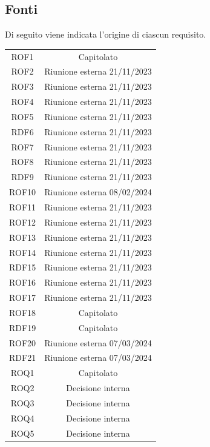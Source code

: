 \documentclass{article}
\newcommand{\custombold}{\contour{black}}
\begin{document}
\subsection{Fonti}
Di seguito viene indicata l'origine di ciascun requisito.\\
\begin{center}
\begin{tabular}{|c|c|}
\hline
\rowcolor{Blue}
\custombold{ID}&\custombold{Fonte}\\
\hline
\rowcolor{LighterBlue}
ROF1 & Capitolato\\
\hline
\rowcolor{LightBlue}
ROF2 & Riunione esterna 21/11/2023\\
\hline
\rowcolor{LighterBlue}
ROF3 & Riunione esterna 21/11/2023\\
\hline
\rowcolor{LightBlue}
ROF4 & Riunione esterna 21/11/2023\\
\hline
\rowcolor{LighterBlue}
ROF5 & Riunione esterna 21/11/2023\\
\hline
\rowcolor{LightBlue}
RDF6 & Riunione esterna 21/11/2023\\
\hline
\rowcolor{LighterBlue}
ROF7 & Riunione esterna 21/11/2023\\
\hline
\rowcolor{LightBlue}
ROF8 & Riunione esterna 21/11/2023\\
\hline
\rowcolor{LighterBlue}
RDF9 & Riunione esterna 21/11/2023\\
\hline
\rowcolor{LightBlue}
ROF10 & Riunione esterna 08/02/2024\\
\hline
\rowcolor{LighterBlue}
ROF11 & Riunione esterna 21/11/2023\\
\hline
\rowcolor{LightBlue}
ROF12 & Riunione esterna 21/11/2023\\
\hline
\rowcolor{LighterBlue}
ROF13 & Riunione esterna 21/11/2023\\
\hline
\rowcolor{LightBlue}
ROF14 & Riunione esterna 21/11/2023\\
\hline
\rowcolor{LighterBlue}
RDF15 & Riunione esterna 21/11/2023\\
\hline
\rowcolor{LightBlue}
ROF16 & Riunione esterna 21/11/2023\\
\hline
\rowcolor{LighterBlue}
ROF17 & Riunione esterna 21/11/2023\\
\hline
\rowcolor{LightBlue}
ROF18 & Capitolato\\
\hline
\rowcolor{LighterBlue}
RDF19 & Capitolato\\
\hline
\rowcolor{LightBlue}
ROF20 & Riunione esterna 07/03/2024\\
\hline
\rowcolor{LighterBlue}
RDF21 & Riunione esterna 07/03/2024\\
\hline
\rowcolor{LightBlue}
ROQ1 & Capitolato\\
\hline
\rowcolor{LighterBlue}
ROQ2 & Decisione interna\\
\hline
\rowcolor{LightBlue}
ROQ3 & Decisione interna\\
\hline
\rowcolor{LighterBlue}
ROQ4 & Decisione interna\\
\hline
\rowcolor{LightBlue}
ROQ5 & Decisione interna\\
\hline
\end{tabular}
\end{center}
\end{document}
